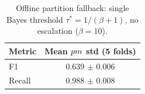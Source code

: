 \begin{table}[!t]
\centering
\caption{Offline partition fallback: single Bayes threshold $\tau^\ast{=}1/(\beta{+}1)$, no escalation ($\beta{=}10$).}
\label{tab:partitionfallback}
\begin{tabular}{lc}
\toprule
Metric & Mean $\\pm$ std (5 folds) \\
\midrule
F1 & 0.639 $\pm$ 0.006 \\
Recall & 0.988 $\pm$ 0.008 \\
\bottomrule
\end{tabular}
\end{table}
